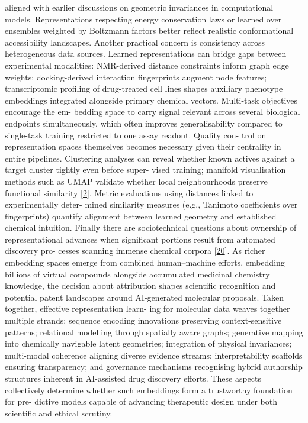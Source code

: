 \documentclass[
]{article}
\begin{document}
aligned with earlier discussions on geometric invariances in
computational models. Representations respecting energy conservation
laws or learned over ensembles weighted by Boltzmann factors better
reflect realistic conformational accessibility landscapes. Another
practical concern is consistency across heterogeneous data sources.
Learned representations can bridge gaps between experimental modalities:
NMR-derived distance constraints inform graph edge weights;
docking-derived interaction fingerprints augment node features;
transcriptomic profiling of drug-treated cell lines shapes auxiliary
phenotype embeddings integrated alongside primary chemical vectors.
Multi-task objectives encourage the em- bedding space to carry signal
relevant across several biological endpoints simultaneously, which often
improves generalisability compared to single-task training restricted to
one assay readout. Quality con- trol on representation spaces themselves
becomes necessary given their centrality in entire pipelines. Clustering
analyses can reveal whether known actives against a target cluster
tightly even before super- vised training; manifold visualisation
methods such as UMAP validate whether local neighbourhoods preserve
functional similarity {[}\hyperref[_bookmark42]{2}{]}. Metric
evaluations using distances linked to experimentally deter- mined
similarity measures (e.g., Tanimoto coefficients over fingerprints)
quantify alignment between learned geometry and established chemical
intuition. Finally there are sociotechnical questions about ownership of
representational advances when significant portions result from
automated discovery pro- cesses scanning immense chemical corpora
{[}\hyperref[_bookmark60]{20}{]}. As richer embedding spaces emerge from
combined human--machine efforts, embedding billions of virtual compounds
alongside accumulated medicinal chemistry knowledge, the decision about
attribution shapes scientific recognition and potential patent
landscapes around AI-generated molecular proposals. Taken together,
effective representation learn- ing for molecular data weaves together
multiple strands: sequence encoding innovations preserving
context-sensitive patterns; relational modelling through spatially aware
graphs; generative mapping into chemically navigable latent geometries;
integration of physical invariances; multi-modal coherence aligning
diverse evidence streams; interpretability scaffolds ensuring
transparency; and governance mechanisms recognising hybrid authorship
structures inherent in AI-assisted drug discovery efforts. These aspects
collectively determine whether such embeddings form a trustworthy
foundation for pre- dictive models capable of advancing therapeutic
design under both scientific and ethical scrutiny.
\end{document}
